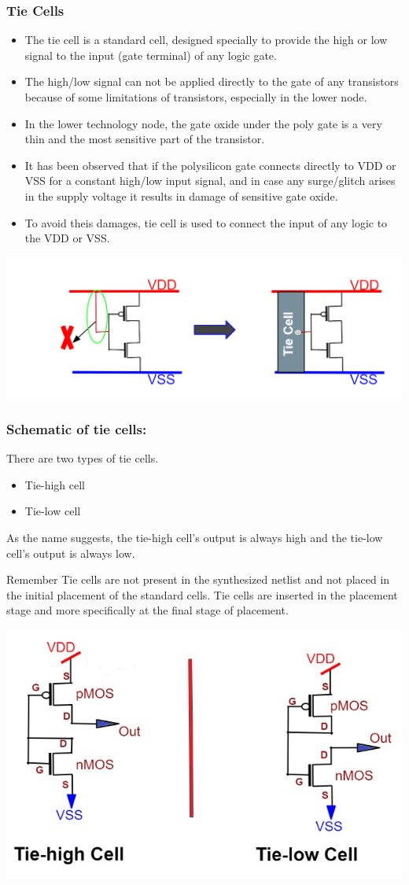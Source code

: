 \documentclass{beamer}
\begin{document}
\begin{frame}
	\frametitle{Tie Cells}
	\begin{itemize}
		\item The tie cell is a standard cell, designed specially to provide the high or low signal to the input (gate terminal) of any logic gate. 
		\item The high/low signal can not be applied directly to the gate of any transistors because of some limitations of transistors, especially in the lower node. 
		\item In the lower technology node, the gate oxide under the poly gate is a very thin and the most sensitive part of the transistor.
		\item It has been observed that if the polysilicon gate connects directly to VDD or VSS for a constant high/low input signal, and in case any surge/glitch arises in the supply voltage it results in damage of sensitive gate oxide.
		\item To avoid theis damages, tie cell is used to connect the input of any logic to the VDD or VSS.
	\end{itemize}
	\begin{center}
		\includegraphics[width=0.4 \textwidth]{Tie_cell_need}
	\end{center}
\end{frame}	
\begin{frame}
	\frametitle{Schematic of tie cells:}
	There are two types of tie cells.
	\begin{itemize}
		\item Tie-high cell
		\item Tie-low cell
	\end{itemize}
	As the name suggests, the tie-high cell’s output is always high and the tie-low cell’s output is always low.	
	\begin{block}{Remember}
Tie cells are not present in the synthesized netlist and not placed in the initial placement of the standard cells. Tie cells are inserted in the placement stage and more specifically at the final stage of placement.
\end{block}
	\begin{center}
		\includegraphics[width=0.4 \textwidth]{What-are-Tie-Cells-in-Physical-Design}
	\end{center}
\end{frame}	
\end{document}
